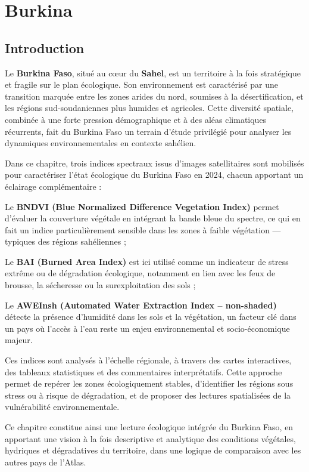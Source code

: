 \documentclass[
]{book}
\begin{document}
\chapter{Burkina}\label{burkina}

\section{Introduction}\label{introduction-1}

Le \textbf{Burkina Faso}, situé au cœur du \textbf{Sahel}, est un territoire à la fois stratégique et fragile sur le plan écologique. Son environnement est caractérisé par une transition marquée entre les zones arides du nord, soumises à la désertification, et les régions sud-soudaniennes plus humides et agricoles. Cette diversité spatiale, combinée à une forte pression démographique et à des aléas climatiques récurrents, fait du Burkina Faso un terrain d'étude privilégié pour analyser les dynamiques environnementales en contexte sahélien.

Dans ce chapitre, trois indices spectraux issus d'images satellitaires sont mobilisés pour caractériser l'état écologique du Burkina Faso en 2024, chacun apportant un éclairage complémentaire :

Le \textbf{BNDVI (Blue Normalized Difference Vegetation Index)} permet d'évaluer la couverture végétale en intégrant la bande bleue du spectre, ce qui en fait un indice particulièrement sensible dans les zones à faible végétation --- typiques des régions sahéliennes ;

Le \textbf{BAI (Burned Area Index)} est ici utilisé comme un indicateur de stress extrême ou de dégradation écologique, notamment en lien avec les feux de brousse, la sécheresse ou la surexploitation des sols ;

Le \textbf{AWEInsh (Automated Water Extraction Index -- non-shaded)} détecte la présence d'humidité dans les sols et la végétation, un facteur clé dans un pays où l'accès à l'eau reste un enjeu environnemental et socio-économique majeur.

Ces indices sont analysés à l'échelle régionale, à travers des cartes interactives, des tableaux statistiques et des commentaires interprétatifs. Cette approche permet de repérer les zones écologiquement stables, d'identifier les régions sous stress ou à risque de dégradation, et de proposer des lectures spatialisées de la vulnérabilité environnementale.

Ce chapitre constitue ainsi une lecture écologique intégrée du Burkina Faso, en apportant une vision à la fois descriptive et analytique des conditions végétales, hydriques et dégradatives du territoire, dans une logique de comparaison avec les autres pays de l'Atlas.
\end{document}

